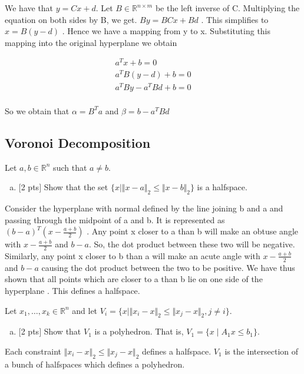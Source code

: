 \documentclass[12pt]{article}
\begin{document}
We have that $y = Cx+d$. Let $B \in \mathbb{R}^{n\times m} $ be the left inverse of C. Multiplying the equation on both sides by B, we get. $By = BCx +Bd$ . This simplifies to $x = B(y-d)$ . Hence we have a mapping from y to x. Substituting this mapping into the original hyperplane we obtain

\begin{align*}
a^Tx+b = 0\\
a^TB(y-d)+b = 0 \\
a^TBy - a^TBd + b = 0 \\
\end{align*}

So we obtain that $\alpha = B^Ta$ and $\beta = b-a^TBd$

\subsection{Voronoi Decomposition}

Let $a,b\in\mathbb{R}^n$ such that $a\ne b$.
\begin{enumerate}[(a)]
\item
$[$2 pts$]$  Show that the set $\{ x \mid \Vert x-a \Vert_2 \le \Vert x-b \Vert_2\}$ is a halfspace.
\end{enumerate}

Consider the hyperplane with normal defined by the line joining b and a and passing through the midpoint of a and b. It is represented as $(b-a)^T(x-\frac{a+b}{2})$ . Any point x closer to a than b will make an obtuse angle with $x-\frac{a+b}{2}$ and $b-a$. So, the dot product between these two will be negative. Similarly, any point x closer to b than a will make an acute angle with $x-\frac{a+b}{2}$ and $b-a$ causing the dot product between the two to be positive. We have thus shown that all points which are closer to a than b lie on one side of the hyperplane . This defines a halfspace. 

\vspace{.25cm} 

\noindent Let $x_1,\ldots,x_k\in\mathbb{R}^n$ and let $V_i = \{x \mid \Vert x_i-x \Vert_2 \le \Vert x_j-x \Vert_2, j\ne i \}$.
\begin{enumerate}[(b)]
\item
$[$2 pts$]$  Show that $V_1$ is a polyhedron.  That is, $V_1 = \{x \mid A_1x \le b_1\}$.
\end{enumerate}

Each constraint $\Vert x_i-x \Vert_2 \le \Vert x_j-x \Vert_2$ defines a halfspace. $V_1$ is the intersection of a bunch of halfspaces which defines a polyhedron. 
\end{document}
